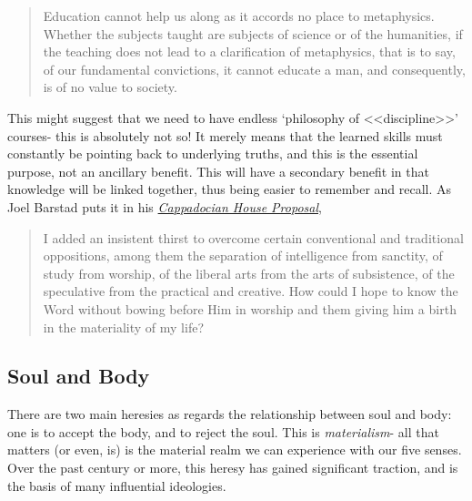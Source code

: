 \documentclass[letterpaper]{article}
\begin{document}
\iffalse
Indeed to harken back to Eden,

\begin{quote}
  Sorrow is knowledge; they who know the most

  Must mourn the deepest o'er the fatal truth,

  The Tree of Knowledge is not that of Life.
  \attrib{\textit{Manfred}, George Gordon Byron 1817}
\end{quote}
\fi

\begin{quote}
  Education cannot help us along as it accords no place to metaphysics. Whether the subjects taught are subjects of science or of the humanities, if the teaching does not lead to a clarification of metaphysics, that is to say, of our fundamental convictions, it cannot educate a man, and consequently, is of no value to society.
\end{quote}

This might suggest that we need to have endless `philosophy of <<discipline>>' courses- this is absolutely not so! It merely means that the learned skills must constantly be pointing back to underlying truths, and this is the essential purpose, not an ancillary benefit. This will have a secondary benefit in that knowledge will be linked together, thus being easier to remember and recall. As Joel Barstad puts it in his \href{https://byzantinela.com/cappadocian-house-proposal/}{\textit{Cappadocian House Proposal}},

\begin{quote}
  I added an insistent thirst to overcome certain conventional and traditional oppositions, among them the separation of intelligence from sanctity, of study from worship, of the liberal arts from the arts of subsistence, of the speculative from the practical and creative. How could I hope to know the Word without bowing before Him in worship and them giving him a birth in the materiality of my life?
\end{quote}

\subsection{Soul and Body}

There are two main heresies as regards the relationship between soul and body: one is to accept the body, and to reject the soul. This is \textit{materialism}- all that matters (or even, is) is the material realm we can experience with our five senses. Over the past century or more, this heresy has gained significant traction, and is the basis of many influential ideologies.
\end{document}
